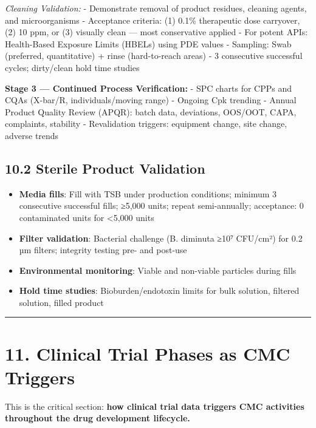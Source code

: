 \documentclass[
  11pt,
  a4paper,
]{report}
\providecommand{\tightlist}{%
  \setlength{\itemsep}{0pt}\setlength{\parskip}{0pt}}
\begin{document}
\emph{Cleaning Validation:} - Demonstrate removal of product residues,
cleaning agents, and microorganisms - Acceptance criteria: (1) 0.1\%
therapeutic dose carryover, (2) 10 ppm, or (3) visually clean --- most
conservative applied - For potent APIs: Health-Based Exposure Limits
(HBELs) using PDE values - Sampling: Swab (preferred, quantitative) +
rinse (hard-to-reach areas) - 3 consecutive successful cycles;
dirty/clean hold time studies

\textbf{Stage 3 --- Continued Process Verification:} - SPC charts for
CPPs and CQAs (X-bar/R, individuals/moving range) - Ongoing Cpk trending
- Annual Product Quality Review (APQR): batch data, deviations, OOS/OOT,
CAPA, complaints, stability - Revalidation triggers: equipment change,
site change, adverse trends

\hypertarget{sterile-product-validation}{%
\subsection{10.2 Sterile Product
Validation}\label{sterile-product-validation}}

\begin{itemize}
\tightlist
\item
  \textbf{Media fills}: Fill with TSB under production conditions;
  minimum 3 consecutive successful fills; ≥5,000 units; repeat
  semi-annually; acceptance: 0 contaminated units for \textless5,000
  units
\item
  \textbf{Filter validation}: Bacterial challenge (B. diminuta ≥10⁷
  CFU/cm²) for 0.2 µm filters; integrity testing pre- and post-use
\item
  \textbf{Environmental monitoring}: Viable and non-viable particles
  during fills
\item
  \textbf{Hold time studies}: Bioburden/endotoxin limits for bulk
  solution, filtered solution, filled product
\end{itemize}

\begin{center}\rule{0.5\linewidth}{0.5pt}\end{center}

\hypertarget{clinical-trial-phases-as-cmc-triggers}{%
\section{11. Clinical Trial Phases as CMC
Triggers}\label{clinical-trial-phases-as-cmc-triggers}}

This is the critical section: \textbf{how clinical trial data triggers
CMC activities throughout the drug development lifecycle.}
\end{document}
